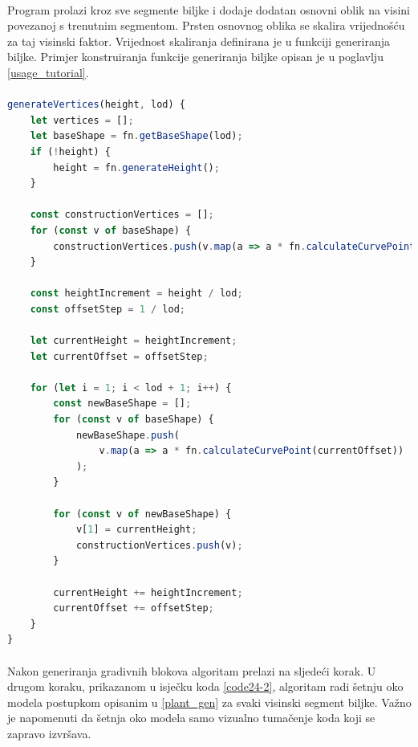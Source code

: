 \documentclass[times, utf8, diplomski]{fer}
\begin{document}
\paragraph{}
Program prolazi kroz sve segmente biljke i dodaje dodatan osnovni oblik na visini povezanoj s trenutnim segmentom. Prsten osnovnog oblika se skalira vrijednošću za taj visinski faktor. Vrijednost skaliranja definirana je u funkciji generiranja biljke. Primjer konstruiranja funkcije generiranja biljke opisan je u poglavlju \ref{usage_tutorial}.

\paragraph{}
\begin{lstlisting}[language=Javascript,caption=Generiranje gradivnih točaka modela biljke,label=code24-1]
generateVertices(height, lod) {
	let vertices = [];
	let baseShape = fn.getBaseShape(lod);
	if (!height) {
		height = fn.generateHeight();
	}

	const constructionVertices = [];
	for (const v of baseShape) {
		constructionVertices.push(v.map(a => a * fn.calculateCurvePoint(0)));
	}

	const heightIncrement = height / lod;
	const offsetStep = 1 / lod;

	let currentHeight = heightIncrement;
	let currentOffset = offsetStep;

	for (let i = 1; i < lod + 1; i++) {
		const newBaseShape = [];
		for (const v of baseShape) {
			newBaseShape.push(
				v.map(a => a * fn.calculateCurvePoint(currentOffset))
			);
		}

		for (const v of newBaseShape) {
			v[1] = currentHeight;
			constructionVertices.push(v);
		}

		currentHeight += heightIncrement;
		currentOffset += offsetStep;
	}
}
\end{lstlisting}

\paragraph{}
Nakon generiranja gradivnih blokova algoritam prelazi na sljedeći korak. U drugom koraku, prikazanom u isječku koda \ref{code24-2}, algoritam radi šetnju oko modela postupkom opisanim u \ref{plant_gen} za svaki visinski segment biljke. Važno je napomenuti da šetnja oko modela samo vizualno tumačenje koda koji se zapravo izvršava.
\end{document}

